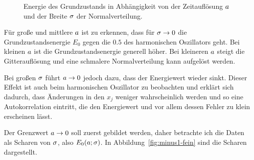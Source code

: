 \begin{figure}[htbp]
    \centering
    \caption{%
        Energie des Grundzustands in Abhängigkeit von der Zeitauflösung
        $a$ und der Breite $\sigma$ der Normalverteilung.
    }
    \label{fig:mesh-e0}
\end{figure}

Für große und mittlere $a$ ist zu erkennen, dass für $\sigma \to
0$ die Grundzustandsenergie $E_0$ gegen die $\num{0.5}$ des harmonischen
Oszillators geht. Bei kleinen $a$ ist die Grundzustandsenergie generell
höher. Bei kleineren $a$ steigt die Gitterauflösung und eine schmalere
Normalverteilung kann aufgelöst werden.

Bei großen $\sigma$ führt $a \to 0$ jedoch dazu, dass der
Energiewert wieder sinkt. Dieser Effekt ist auch beim harmonischen Oszillator
zu beobachten und erklärt sich dadurch, dass Änderungen in den $x_j$ weniger
wahrscheinlich werden und so eine Autokorrelation eintritt, die den Energiewert
und vor allem dessen Fehler zu klein erscheinen lässt.

Der Grenzwert $a \to 0$ soll zuerst gebildet werden, daher betrachte
ich die Daten als Scharen von $\sigma$, also $E_0(a;
\sigma)$. In Abbildung~\ref{fig:minus1-fein} sind die Scharen dargestellt.

